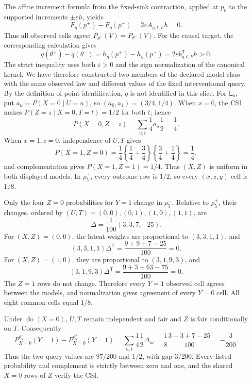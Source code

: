 The affine increment formula from the fixed-sink contraction, applied at \(p_0\) to the supported increments \(\pm\varepsilon h\), yields
\[
 F_\eta(p^+)-F_\eta(p^-)
 =2\varepsilon A_{\eta,t,F}h=0.
\]
Thus all observed cells agree: \(P_{\theta^+}(V)=P_{\theta^-}(V)\). For the causal target, the corresponding calculation gives
\[
 q(\theta^+)-q(\theta^-)
 =h_\eta(p^+)-h_\eta(p^-)
 =2\varepsilon b_{\eta,t,F}^{\mathsf T}h>0.
\]
The strict inequality uses both \(\varepsilon>0\) and the sign normalization of the canonical kernel. We have therefore constructed two members of the declared model class with the same observed law and different values of the fixed interventional query. By the definition of point identification, \(q\) is not identified in this slice.
For \(\mathsf E_5\), put \(a_u=P(X=0\mid U=u)\), so \((a_0,a_1)=(3/4,1/4)\). When \(x=0\), the CSI makes \(P(Z=z\mid X=0,T=t)=1/2\) for both \(t\); hence
\[
 P(X=0,Z=z)=\sum_{u,t}\frac14 a_u\frac12=\frac14.
\]
When \(x=1,z=0\), independence of \(U,T\) gives
\[
 P(X=1,Z=0)
 =\frac14\left\{\frac14+\frac34\right\}
          \left\{\frac34+\frac14\right\}
 =\frac14,
\]
and complementation gives \(P(X=1,Z=1)=1/4\). Thus \((X,Z)\) is uniform in both displayed models. In \(\rho^+_5\), every outcome row is \(1/2\), so every \((x,z,y)\) cell is \(1/8\).

Only the four \(Z=0\) probabilities for \(Y=1\) change in \(\rho^-_5\). Relative to \(\rho^+_5\), their changes, ordered by \((U,T)=(0,0),(0,1),(1,0),(1,1)\), are
\[
 \Delta=\frac1{100}(3,3,7,-25).
\]
For \((X,Z)=(0,0)\), the latent weights are proportional to \((3,3,1,1)\), and
\[
 (3,3,1,1)\Delta^{\mathsf T}
 =\frac{9+9+7-25}{100}=0.
\]
For \((X,Z)=(1,0)\), they are proportional to \((3,1,9,3)\), and
\[
 (3,1,9,3)\Delta^{\mathsf T}
 =\frac{9+3+63-75}{100}=0.
\]
The \(Z=1\) rows do not change. Therefore every \(Y=1\) observed cell agrees between the models, and normalization gives agreement of every \(Y=0\) cell. All eight common cells equal \(1/8\).

Under \(\operatorname{do}(X=0)\), \(U,T\) remain independent and fair and \(Z\) is fair conditionally on \(T\). Consequently
\[
 P_{X=0}^{\rho^-_5}(Y=1)-P_{X=0}^{\rho^+_5}(Y=1)
 =\sum_{u,t}\frac14\frac12\Delta_{ut}
 =\frac18\frac{3+3+7-25}{100}
 =-\frac3{200}.
\]
Thus the two query values are \(97/200\) and \(1/2\), with gap \(3/200\). Every listed probability and complement is strictly between zero and one, and the shared \(X=0\) rows of \(Z\) verify the CSI.

